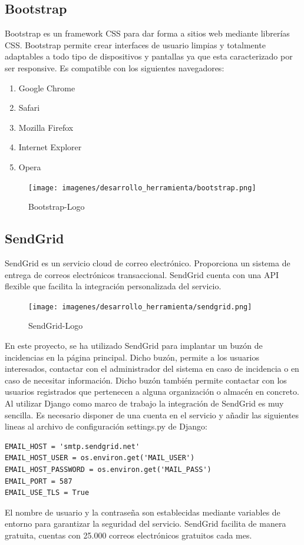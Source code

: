 \documentclass[a4paper,11pt]{book}
\begin{document}
\subsection{Bootstrap}
Bootstrap\cite{boo} es un framework CSS para dar forma a sitios web mediante librerías CSS. Bootstrap  permite crear interfaces de usuario limpias y totalmente adaptables a todo tipo de dispositivos y pantallas ya que esta caracterizado por ser responsive. Es compatible con los siguientes navegadores: 

\begin{enumerate}
\item Google Chrome
\item Safari
\item Mozilla Firefox 
\item Internet Explorer 
\item Opera  
\end{enumerate}

\begin{figure}[H] 
\centering 
\texttt{[image: imagenes/desarrollo\_herramienta/bootstrap.png]}
\caption{ Bootstrap-Logo\cite{booL}  }  
\end{figure}  

\subsection{SendGrid}
SendGrid\cite{sg} es un servicio cloud de correo electrónico. Proporciona un sistema de entrega de correos electrónicos transaccional. SendGrid cuenta con una API flexible que facilita la integración personalizada del servicio. 

\begin{figure}[H] 
\centering 
\texttt{[image: imagenes/desarrollo\_herramienta/sendgrid.png]}
\caption{ SendGrid-Logo\cite{sgL}  }  
\end{figure}  

En este proyecto, se ha utilizado SendGrid para implantar un buzón de incidencias en la página principal. Dicho buzón, permite a los usuarios interesados, contactar con el administrador del sistema en caso de incidencia o en caso de necesitar información. Dicho buzón también permite contactar con los usuarios registrados que pertenecen a alguna organización o almacén en concreto. Al utilizar Django como marco de trabajo la integración de  SendGrid  es muy sencilla. Es necesario disponer de una cuenta en el servicio y añadir las siguientes lineas al archivo de configuración settings.py de Django:
\begin{lstlisting}
EMAIL_HOST = 'smtp.sendgrid.net'
EMAIL_HOST_USER = os.environ.get('MAIL_USER')
EMAIL_HOST_PASSWORD = os.environ.get('MAIL_PASS')
EMAIL_PORT = 587
EMAIL_USE_TLS = True
\end{lstlisting}
El nombre de usuario y la contraseña son establecidas mediante variables de entorno para garantizar la seguridad del servicio. SendGrid facilita de manera gratuita, cuentas con 25.000 correos electrónicos gratuitos cada mes.  
 
\end{document}
